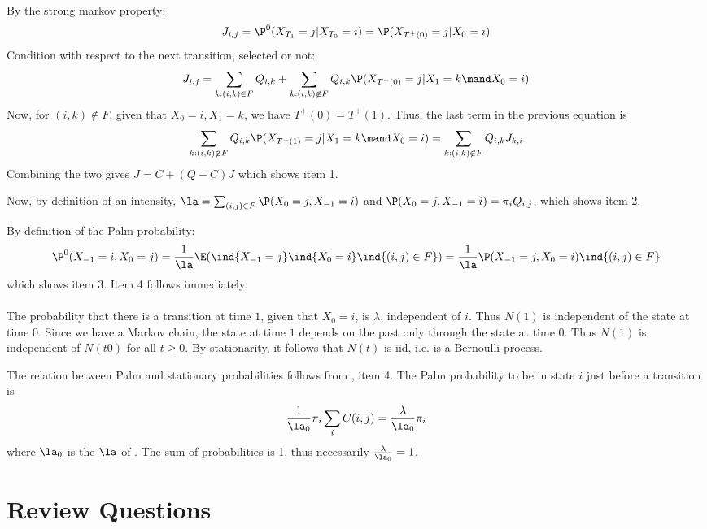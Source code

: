 \begin{petit}
\paragraph{}
By the strong markov property:
$$
J_{i,j}=\P^0(X_{T_1}=j|X_{T_0}=i)=\P(X_{T^+(0)}=j|X_0=i)
$$
Condition with respect to the next transition, selected or not:
$$
J_{i,j}=\sum_{k: (i,k) \in F}Q_{i,k} + \sum_{k: (i,k) \not\in F}Q_{i,k}\P(X_{T^+(0)}=j | X_1=k
\mand X_0=i)
$$
Now, for $(i,k) \not\in F$, given that $X_0=i, X_1=k$, we have
$T^+(0)=T^+(1)$. Thus, the last term in the previous equation
is
$$
\sum_{k: (i,k) \not\in F}Q_{i,k}\P(X_{T^+(1)}=j |X_1=k \mand X_0=i)=\sum_{k: (i,k) \not\in
F}Q_{i,k}J_{k,i}
$$
Combining the two gives $J=C+ (Q -C)J$ which shows item 1.

Now, by definition of an intensity, $\la=\sum_{(i,j)\in
F}\P(X_0=j,X_{-1}=i)$ and $\P(X_0=j,X_{-1}=i)=\pi_i Q_{i,j}$,
which shows item 2.

By definition of the Palm probability:
$$\P^0(X_{-1}=i,X_{0}=j)=\frac{1}{\la}\E(\ind{X_{-1}=j} \ind{ X_0=i} \ind{(i,j)\in F})
=\frac{1}{\la}\P(X_{-1}=j, X_0=i) \ind{(i,j)\in F}$$ which shows item 3. Item 4 follows
immediately.


\paragraph{} The probability that
there is a transition at time $1$, given that $X_0=i$, is
$\lambda$, independent of $i$. Thus $N(1)$ is independent of
the state at time $0$. Since we have a Markov chain, the state
at time $1$ depends on the past only through the state at time
$0$. Thus $N(1)$ is independent of $N(t0)$ for all $t\geq 0$.
By stationarity, it follows that $N(t)$ is iid, i.e. is a
Bernoulli process.

The relation between Palm and stationary probabilities follows
from , item 4. The Palm probability to be
in state $i$ just before a transition is
$$
\frac{1}{\la_0}\pi_{i}\sum_i C(i,j)=\frac{\lambda}{\la_0}\pi_i
$$where $\la_0$ is the $\la$ of . The sum of probabilities is 1, thus necessarily $\frac{\lambda}{\la_0}=1$.


\end{petit}
\section{Review Questions}




